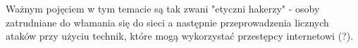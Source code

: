 



Ważnym pojęciem w tym temacie są tak zwani "etyczni hakerzy" - osoby zatrudniane do włamania się do sieci a następnie przeprowadzenia licznych ataków przy użyciu technik, które mogą wykorzystać przestępcy internetowi (?).


